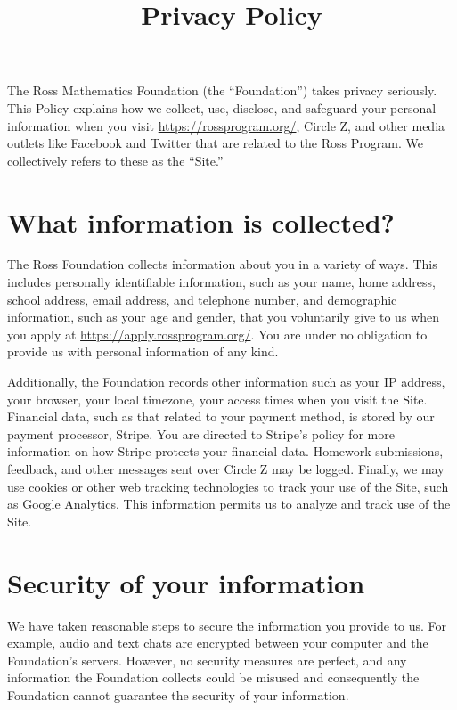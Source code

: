 \documentclass{ross}
\title{Privacy Policy}
\begin{document}
\maketitle

The Ross Mathematics Foundation (the ``Foundation'') takes privacy
seriously. This Policy explains how we collect, use, disclose, and
safeguard your personal information when you visit
\url{https://rossprogram.org/}, Circle Z, and other media outlets like
Facebook and Twitter that are related to the Ross Program.  We
collectively refers to these as the ``Site.''

\section{What information is collected?}

The Ross Foundation collects information about you in a variety of
ways. This includes personally identifiable information, such as your
name, home address, school address, email address, and telephone
number, and demographic information, such as your age and gender, that
you voluntarily give to us when you apply at
\url{https://apply.rossprogram.org/}.  You are under no obligation to
provide us with personal information of any kind.

Additionally, the Foundation records other information such as your IP
address, your browser, your local timezone, your access times when you
visit the Site.  Financial data, such as that related to your payment
method, is stored by our payment processor, Stripe.  You are directed
to Stripe's policy for more information on how Stripe protects your
financial data.  Homework submissions, feedback, and other messages
sent over Circle Z may be logged.  Finally, we may use cookies or
other web tracking technologies to track your use of the Site,
such as Google Analytics.  This information permits us to analyze
and track use of the Site.

\section{Security of your information}

We have taken reasonable steps to secure the information you provide
to us. For example, audio and text chats are encrypted between your
computer and the Foundation's servers.  However, no security measures
are perfect, and any information the Foundation collects could be
misused and consequently the Foundation cannot guarantee the security
of your information.
\end{document}
